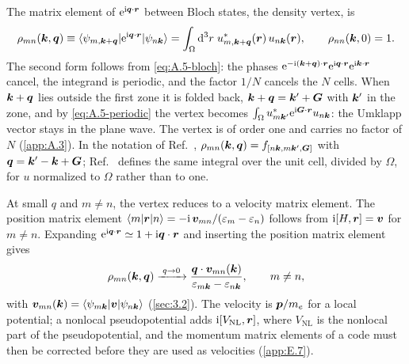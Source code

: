 The matrix element of $\mathrm{e}^{\mathrm{i}\bm{q}\cdot\bm{r}}$ between Bloch states, the density vertex, is
\begin{equation}
  \rho_{mn}(\bm{k},\bm{q}) \equiv \langle\psi_{m,\bm{k}+\bm{q}}|\mathrm{e}^{\mathrm{i}\bm{q}\cdot\bm{r}}|\psi_{n\bm{k}}\rangle
  = \int_\Omega\mathrm{d}^3r\;u^*_{m,\bm{k}+\bm{q}}(\bm{r})\,u_{n\bm{k}}(\bm{r}),
  \qquad \rho_{nn}(\bm{k},0) = 1 .
  \label{eq:A.5-rho}
\end{equation}
The second form follows from \cref{eq:A.5-bloch}: the phases $\mathrm{e}^{-\mathrm{i}(\bm{k}+\bm{q})\cdot\bm{r}}\mathrm{e}^{\mathrm{i}\bm{q}\cdot\bm{r}}\mathrm{e}^{\mathrm{i}\bm{k}\cdot\bm{r}}$ cancel, the integrand is periodic, and the factor $1/N$ cancels the $N$ cells. When $\bm{k}+\bm{q}$ lies outside the first zone it is folded back, $\bm{k}+\bm{q} = \bm{k}' + \bm{G}$ with $\bm{k}'$ in the zone, and by \cref{eq:A.5-periodic} the vertex becomes $\int_\Omega u^*_{m\bm{k}'}\mathrm{e}^{\mathrm{i}\bm{G}\cdot\bm{r}}u_{n\bm{k}}$: the Umklapp vector stays in the plane wave. The vertex is of order one and carries no factor of $N$ (\cref{app:A.3}). In the notation of Ref.~\cite[Eq.~(3.16)]{essig2016direct}, $\rho_{mn}(\bm{k},\bm{q}) = f_{[n\bm{k},m\bm{k}',\bm{G}]}$ with $\bm{q} = \bm{k}' - \bm{k} + \bm{G}$; Ref.~\cite[Eq.~(B2)]{knapen2021dark} defines the same integral over the unit cell, divided by $\Omega$, for $u$ normalized to $\Omega$ rather than to one.

At small $q$ and $m \neq n$, the vertex reduces to a velocity matrix element. The position matrix element $\langle m|\bm{r}|n\rangle = -\mathrm{i}\,\bm{v}_{mn}/(\varepsilon_m - \varepsilon_n)$ follows from $\mathrm{i}[H,\bm{r}] = \bm{v}$ for $m\neq n$. Expanding $\mathrm{e}^{\mathrm{i}\bm{q}\cdot\bm{r}} \simeq 1 + \mathrm{i}\bm{q}\cdot\bm{r}$ and inserting the position matrix element gives
\begin{equation}
  \rho_{mn}(\bm{k},\bm{q}) \xrightarrow{\;q\to0\;} \frac{\bm{q}\cdot\bm{v}_{mn}(\bm{k})}{\varepsilon_{m\bm{k}} - \varepsilon_{n\bm{k}}}, \qquad m \neq n,
  \label{eq:A.5-optical}
\end{equation}
with $\bm{v}_{mn}(\bm{k}) = \langle\psi_{m\bm{k}}|\bm{v}|\psi_{n\bm{k}}\rangle$ (\cref{sec:3.2}). The velocity is $\bm{p}/m_e$ for a local potential; a nonlocal pseudopotential adds $\mathrm{i}[V_{\mathrm{NL}},\bm{r}]$, where $V_{\mathrm{NL}}$ is the nonlocal part of the pseudopotential, and the momentum matrix elements of a code must then be corrected before they are used as velocities (\cref{app:E.7}).

